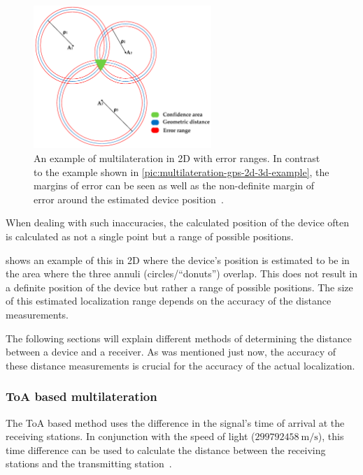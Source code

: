 \begin{figure}[htbp]
    \centering
    \includegraphics[width=0.6\textwidth]{pictures/multilateration/multilateration_error_ranges.png}
    \caption{
        An example of multilateration in 2D with error ranges.
        In contrast to the example shown in \cref{pic:multilateration-gps-2d-3d-example}, the margins of error can be seen as well as the non-definite margin of error around the estimated device position~\protect\cite{kapoor_novel_2016}.
    }\label{pic:multilateration-with-error-ranges-example}
\end{figure}

When dealing with such inaccuracies, the calculated position of the device often is calculated as not a single point but a range of possible positions.

 shows an example of this in 2D where the device's position is estimated to be in the area where the three annuli (circles/``donuts'') overlap.
This does not result in a definite position of the device but rather a range of possible positions.
The size of this estimated localization range depends on the accuracy of the distance measurements.

The following sections will explain different methods of determining the distance between a device and a receiver.
As was mentioned just now, the accuracy of these distance measurements is crucial for the accuracy of the actual localization.

\subsubsection{\acf{ToA} based multilateration}\label{sec:toa-based-multilateration}

The \acf{ToA} based method uses the difference in the signal's time of arrival at the receiving stations.
In conjunction with the speed of light ($299792458\ \mathrm{m/s}$), this time difference can be used to calculate the distance between the receiving stations and the transmitting station~\cite{khalaf-allah_time_2015}.

